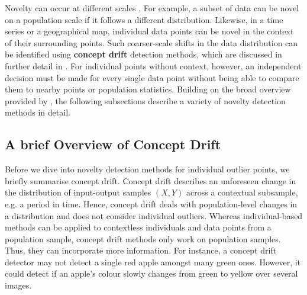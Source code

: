 Novelty can occur at different scales \cite{novelty-detection-2010}. For example, a subset of data can be novel on a population scale if it follows a different distribution. Likewise, in a time series or a geographical map, individual data points can be novel in the context of their surrounding points. Such coarser-scale shifts in the data distribution can be identified using \textbf{concept drift} detection methods, which are discussed in further detail in . For individual points without context, however, an independent decision must be made for every single data point without being able to compare them to nearby points or population statistics. Building on the broad overview provided by \textcite{novelty-detection-2010}, the following subsections describe a variety of novelty detection methods in detail.

\subsection{A brief Overview of Concept Drift} \label{txt:concept-drift}

Before we dive into novelty detection methods for individual outlier points, we briefly summarise concept drift. Concept drift describes an unforeseen change \cite{concept-drift-definition-2019} in the distribution of input-output samples $(X, Y)$ across a contextual subsample, e.g. a period in time. Hence, concept drift deals with population-level changes in a distribution and does not consider individual outliers. Whereas individual-based methods can be applied to contextless individuals and data points from a population sample, concept drift methods only work on population samples. Thus, they can incorporate more information. For instance, a concept drift detector may not detect a single red apple amongst many green ones. However, it could detect if an apple's colour slowly changes from green to yellow over several images.

